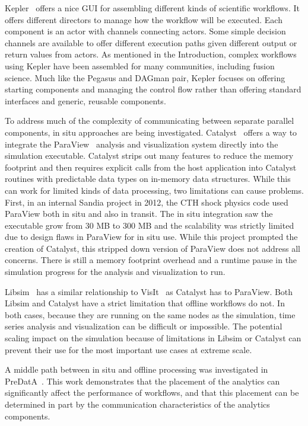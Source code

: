 \documentclass[conference]{IEEEtran}
\begin{document}
Kepler~\cite{bertram:2006:kepler} offers a nice GUI for assembling different
kinds of scientific workflows. It offers different directors to manage how the
workflow will be executed. Each component is an actor with channels connecting
actors. Some simple decision channels are available to offer different
execution paths given different output or return values from actors. As
mentioned in the Introduction, complex workflows using Kepler have been
assembled for many communities, including fusion science. Much like the Pegasus
and DAGman pair, Kepler focuses on offering starting components and managing
the control flow rather than offering standard interfaces and generic, reusable
components.

To address much of the complexity of communicating between separate parallel
components, in situ approaches are being investigated.
Catalyst~\cite{karimabadi:2013:catalyst} offers a way to integrate the
ParaView~\cite{Moreland:2008:paraview} analysis and visualization system
directly into the simulation executable. Catalyst strips out many features to
reduce the memory footprint and then requires explicit calls from the host
application into Catalyst routines with predictable data types on in-memory
data structures. While this can work for limited kinds of data processing, two
limitations can cause problems. First, in an internal Sandia project in 2012,
the CTH shock physics code used ParaView both in situ and also in transit. The
in situ integration saw the executable grow from 30 MB to 300 MB and the
scalability was strictly limited due to design flaws in ParaView for in situ
use. While this project prompted the creation of Catalyst, this stripped down
version of ParaView does not address all concerns. There is still a memory
footprint overhead and a runtime pause in the simulation progress for the
analysis and visualization to run.

Libsim~\cite{whitlock:2011:libsim} has a similar relationship to
VisIt~\cite{Riedel:2007:visit} as Catalyst has to ParaView. Both Libsim and
Catalyst have a strict limitation that offline workflows do not. In both cases,
because they are running on the same nodes as the simulation, time series
analysis and visualization can be difficult or impossible. The potential
scaling impact on the simulation because of limitations in Libsim or Catalyst
can prevent their use for the most important use cases at extreme scale.

A middle path between in situ and offline processing was investigated in
PreDatA~\cite{zheng:2010:predata}.
This work demonstrates that the placement of the analytics can significantly
affect the performance of workflows, and that this placement can be determined
in part by the communication characteristics of the analytics components.
\end{document}
